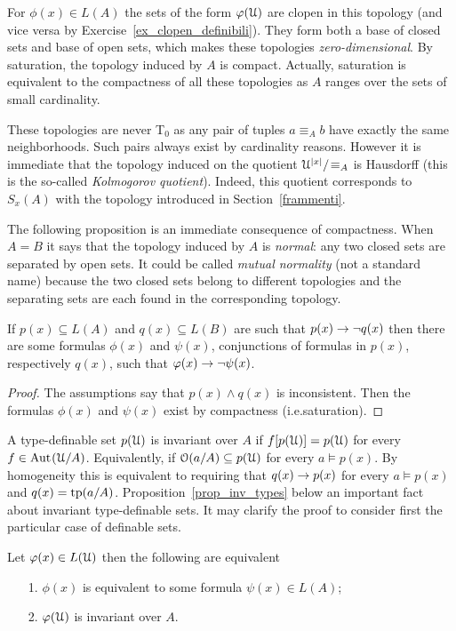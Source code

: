 \documentclass[creche.tex]{subfiles}
\begin{document}
For $\phi(x)\in L(A)$ the sets of the form $\varphi(\EuScript U)$ are clopen in this topology (and vice versa by Exercise~\ref{ex_clopen_definibili}). They form both a base of closed sets and base of open sets, which makes these topologies \textit{zero-dimensional}. By saturation, the topology induced by $A$ is compact. Actually, saturation is equivalent to the compactness of all these topologies as $A$ ranges over the sets of small cardinality.

These topologies are never T$_0$ as any pair of tuples $a\equiv_A b$ have exactly the same neighborhoods. Such pairs always exist by cardinality reasons. However it is immediate that the topology induced on the quotient $\EuScript U^{|x|}/\!\equiv_A$ is Hausdorff (this is the so-called \textit{Kolmogorov quotient}). Indeed, this quotient corresponds to $S_x(A)$ with the topology introduced in Section~\ref{frammenti}.

The following proposition is an immediate consequence of compactness. When $A=B$ it says that the topology induced by $A$ is \textit{normal}: any two closed sets are separated by open sets. It could be called \emph{mutual normality\/} (not a standard name) because the two closed sets belong to different topologies and the separating sets are each found in the corresponding topology.

\begin{proposition}\label{prop_normality}
If $p(x)\subseteq L(A)$ and $q(x)\subseteq L(B)$ are such that $p(x)\rightarrow \neg q(x)$ then there are some formulas $\phi(x)$ and $\psi(x)$, conjunctions of formulas in $p(x)$, respectively $q(x)$, such that $\varphi(x)\rightarrow\neg\psi(x)$.
\end{proposition}

\begin{proof}
The assumptions say that $p(x)\wedge q(x)$ is inconsistent. Then the formulas $\phi(x)$ and $\psi(x)$ exist by compactness (i.e.\@ saturation).
\end{proof}

A type-definable set $p(\EuScript U)$ is invariant over $A$ if $f[p(\EuScript U)]=p(\EuScript U)$ for every $f\in\textrm{Aut\kern.15ex}(\EuScript U/A)$. Equivalently, if $\EuScript O(a/A)\subseteq p(\EuScript U)$ for every $a\models p(x)$. By homogeneity this is equivalent to requiring that $q(x)\rightarrow p(x)$ for every $a\models p(x)$ and $q(x)={\rm tp}(a/A)$. Proposition~\ref{prop_inv_types} below an important fact about invariant type-definable sets. It may clarify the proof to consider first the particular case of definable sets.

\begin{proposition}\label{prop_inv_def}
Let $\varphi(x)\in L(\EuScript U)$ then the following are equivalent
\begin{itemize}
 \item[1.] $\phi(x)$ is equivalent to some formula $\psi(x)\in L(A)$;
 \item[2.] $\varphi(\EuScript U)$ is invariant over $A$.
\end{itemize}
\end{proposition}
\end{document}
